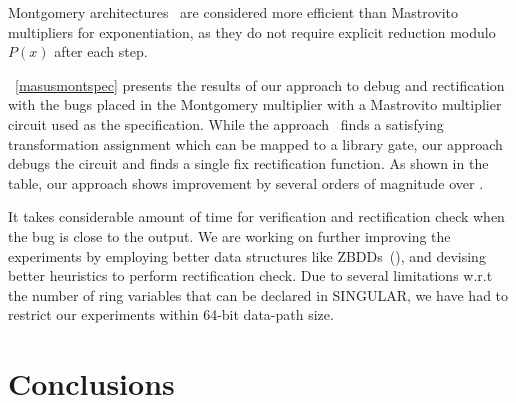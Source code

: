 Montgomery architectures~\cite{acar:1998}
are considered more efficient than Mastrovito multipliers for exponentiation, 
as they do not require explicit reduction modulo $P(x)$ after each step.

~\autoref{masusmontspec} presents the results of our approach to debug
and rectification with the bugs placed in the Montgomery multiplier
with a Mastrovito multiplier circuit used as the specification. While
the approach~\cite{fujita:2015} finds a satisfying transformation
assignment which can be mapped to a library gate, our approach debugs
the circuit and finds a single fix rectification function. As shown in
the table, our approach shows improvement by several orders of
magnitude over \cite{fujita:2015}. 

It takes considerable amount of time for verification and
rectification check when the bug is close to the output. We are
working on further improving the experiments by employing better data
structures like  
ZBDDs~(\cite{minato:zbdd}), and devising better heuristics to perform
rectification check.
Due to several limitations w.r.t the number of ring variables that can be
declared in SINGULAR, we have had to restrict our experiments within
64-bit data-path size.   

\section{Conclusions}

